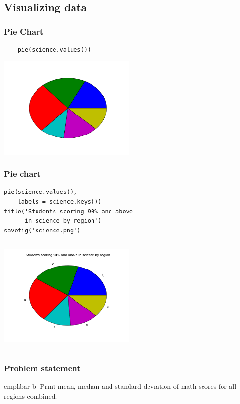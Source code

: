 \documentclass[14pt,compress]{beamer}
\newcommand{\emphbar}[1]
{\begin{beamercolorbox}[rounded=true]{emphbar} 
      {#1}
 \end{beamercolorbox}
}
\newcounter{time}
\newcommand{\inctime}[1]{\addtocounter{time}{#1}{\tiny \thetime\ m}}
\begin{document}
\subsection{Visualizing data}
\begin{frame}[fragile]
  \frametitle{Pie Chart}
  \begin{lstlisting}
    pie(science.values())
  \end{lstlisting}
\includegraphics[height=2in, interpolate=true]{data/science_nolabel}
\end{frame}

\begin{frame}[fragile]
  \frametitle{Pie chart}
  \small
  \begin{lstlisting}
pie(science.values(), 
    labels = science.keys())
title('Students scoring 90% and above 
      in science by region')
savefig('science.png')
  \end{lstlisting}
\begin{columns}
    \hspace*{1.1in}
\includegraphics[height=2in, interpolate=true]{data/science}
\end{columns}
  \inctime{10}
\end{frame}

\begin{frame}
  \frametitle{Problem statement}
    \emphbar{b. Print mean, median and standard deviation of math scores for all regions combined.}
\end{frame}
\end{document}
